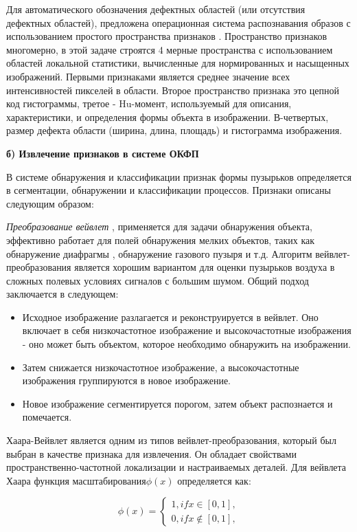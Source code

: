 \documentclass[a4paper,14pt]{extreport}
\begin{document}
Для автоматического обозначения дефектных областей (или отсутствия дефектных областей), предложена  операционная система распознавания образов  с использованием простого пространства признаков . Пространство признаков многомерно, в этой задаче строятся 4 мерные пространства с использованием областей локальной статистики, вычисленные для нормированных и насыщенных изображений. Первыми признаками является среднее значение всех интенсивностей пикселей в области. Второе пространство признака это цепной код гистограммы, третое - Hu-момент, используемый для описания, характеристики, и определения формы объекта в изображении. В-четвертых, размер дефекта области (ширина, длина, площадь) и гистограмма изображения.
		
\textbf{б) Извлечение признаков в системе ОКФП}

В системе обнаружения и классификации признак формы пузырьков  определяется в сегментации, обнаружении и классификации процессов. Признаки описаны следующим образом:

\textit{Преобразование вейвлет} \cite{15wl}, \cite {16wl} применяется для задачи обнаружения объекта, эффективно работает для полей обнаружения мелких объектов, таких как обнаружение диафрагмы \cite{17wl}, обнаружение газового пузыря \cite{18wl} и т.д. Алгоритм вейвлет-преобразования является хорошим вариантом для оценки пузырьков воздуха в сложных полевых условиях сигналов с большим шумом. Общий подход заключается в следующем:
\begin{itemize}
	\item Исходное изображение разлагается и реконструируется в вейвлет. Оно включает в себя низкочастотное изображение и высокочастотные изображения - оно может быть объектом, которое необходимо обнаружить на изображении.
	\item Затем снижается низкочастотное изображение, а высокочастотные изображения группируются в новое изображение.
	\item Новое изображение сегментируется порогом, затем объект распознается и помечается.
\end{itemize}

Хаара-Вейвлет является одним из типов вейвлет-преобразования, который был выбран в качестве признака для извлечения. Он обладает свойствами пространственно-частотной локализации и настраиваемых деталей. 
Для вейвлета Хаара функция масштабирования$\phi\left(x\right)$ определяется как:

\begin{equation} \label{eq5}
\phi\left(x\right)= \left\{\begin{array}{l} 1, if x \in \left[0,1\right],\\
0, if x \notin \left[0,1\right],
\end{array}\right.
\end{equation}
\end{document}
